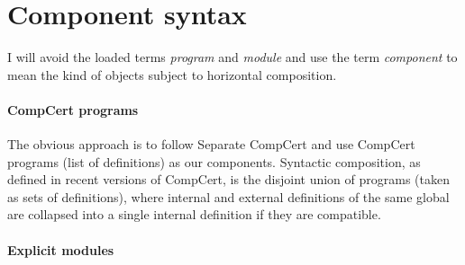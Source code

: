 \documentclass[11pt]{article}
\begin{document}
%
%

\section{Component syntax} %

I will avoid the loaded terms \emph{program} and \emph{module}
and use the term \emph{component}
to mean the kind of objects subject to horizontal composition.

\paragraph{CompCert programs} %

The obvious approach is to follow Separate CompCert and
use CompCert programs (list of definitions) as our components.
Syntactic composition, as defined in recent versions of CompCert,
is the disjoint union of programs (taken as sets of definitions),
where internal and external definitions of the same global
are collapsed into a single internal definition
if they are compatible.


\paragraph{Explicit modules} %
\end{document}
